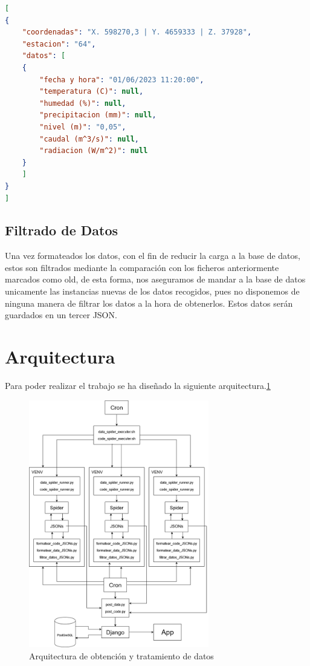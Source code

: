 \begin{lstlisting}[language=json, basicstyle=\small]
[
{
	"coordenadas": "X. 598270,3 | Y. 4659333 | Z. 37928",
	"estacion": "64",
	"datos": [
	{
		"fecha y hora": "01/06/2023 11:20:00",
		"temperatura (C)": null,
		"humedad (%)": null,
		"precipitacion (mm)": null,
		"nivel (m)": "0,05",
		"caudal (m^3/s)": null,
		"radiacion (W/m^2)": null
	}
	]
}
]
\end{lstlisting}

\subsection{Filtrado de Datos}
Una vez formateados los datos, con el fin de reducir la carga a la base de datos, estos son filtrados mediante la comparación con los ficheros anteriormente marcados como old, de esta forma, nos aseguramos de mandar a la base de datos unicamente las instancias nuevas de los datos recogidos, pues no disponemos de ninguna manera de filtrar los datos a la hora de obtenerlos. Estos datos serán guardados en un tercer JSON.

\section{Arquitectura}
Para poder realizar el trabajo se ha diseñado la siguiente arquitectura.\ref{fig:ej7}

\begin{figure} [h]
	\centering
	\includegraphics[width=0.7\textwidth]{fig/arquitectura.png}
	\caption[Arquitectura de obtención y tratamiento de datos]{Arquitectura de obtención y tratamiento de datos}
	\label{fig:ej7}
\end{figure}

